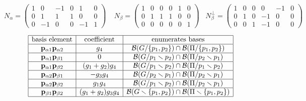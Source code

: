 \[
N_\alpha=
\left(\begin{array}
{cc|cccc}
1 & 0 & -1 & 0 & 1 & 0 \\
0 & 1 & 1 & 1 & 0 & 0 \\
0 & -1 & 0 & 0 & -1 & 1
\end{array}\right)
\;\;\;\;
N_\beta=
\left(\begin{array}
{cc|cccc}
1 & 0 & 0 & 0 & 1 & 0 \\
0 & 1 & 1 & 1 & 0 & 0 \\
0 & 0 & 0 & 0 & 0 & 1
\end{array}\right)
\;\;\;
N_\beta^\perp =
\left(\begin{array}{cc|cccc}
1 & 0 & 0 & 0 & -1 & 0 \\
0 & 1 & 0 & -1 & 0 & 0 \\
0 & 0 & 1 & -1 & 0 & 0
\end{array}\right)
\]


\begin{equation}\label{K4Dirtable}
\begin{array}{|c|c|c|} \hline
\text{basis element} & \text{coefficient} & \text{enumerates bases}\\
  \hline

\mathbf{p}_{\alpha 1}\mathbf{p}_{\alpha 2} &
 g_{4} & \mathcal{B}(G/\{p_1, p_2\}) \cap  \mathcal{B}(\Pi/\{p_1, p_2\})

\\ \hline

\mathbf{p}_{\alpha 1}\mathbf{p}_{\beta 1} &
0 &  \mathcal{B}(G/p_1\smallsetminus p_2)\cap\mathcal{B}(\Pi/p_2\smallsetminus p_1)

\\ \hline

\mathbf{p}_{\alpha 1}\mathbf{p}_{\beta 2} &
 (g_{1} +  g_{2}) g_{4} & \mathcal{B}(G/p_1\smallsetminus p_2)  \cap \mathcal{B}(\Pi/p_1\smallsetminus p_2)
\\ \hline 

\mathbf{p}_{\alpha 2}\mathbf{p}_{\beta 1} &
- g_{3} g_{4} & \mathcal{B}(G/p_2\smallsetminus p_1) \cap \mathcal{B}(\Pi/p_2\smallsetminus p_1)
\\ \hline
 
\mathbf{p}_{\alpha 2}\mathbf{p}_{\beta 2} &
 g_{1} g_{4} & \mathcal{B}(G/p_1\smallsetminus p_2)\cap\mathcal{B}(\Pi/p_2\smallsetminus p_1)
\\ \hline
 
\mathbf{p}_{\beta 1}\mathbf{p}_{\beta 2} &
 (g_{1} +g_{2}) g_{3} g_{4} & \mathcal{B}(G\smallsetminus \{p_1, p_2\})  \cap \mathcal{B}(\Pi\smallsetminus \{p_1, p_2\})
\\ \hline

\end{array}
\end{equation}



